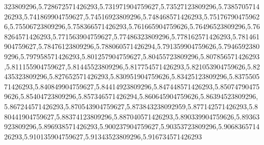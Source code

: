 323809296,5.728672571426293,5.731971904759627,5.73527123809296,5.738570571426293,5.741869904759627,5.74516923809296,5.748468571426293,5.751767904759626,5.75506723809296,5.758366571426293,5.761665904759626,5.76496523809296,5.768264571426293,5.771563904759627,5.77486323809296,5.778162571426293,5.781461904759627,5.78476123809296,5.788060571426294,5.791359904759626,5.79465923809296,5.797958571426293,5.801257904759627,5.80455723809296,5.807856571426293,5.811155904759627,5.81445523809296,5.817754571426293,5.821053904759626,5.82435323809296,5.827652571426293,5.830951904759626,5.83425123809296,5.837550571426293,5.840849904759627,5.84414923809296,5.847448571426293,5.850747904759626,5.85404723809296,5.857346571426294,5.860645904759626,5.86394523809296,5.867244571426293,5.870543904759627,5.873843238092959,5.877142571426293,5.880441904759627,5.88374123809296,5.887040571426293,5.890339904759626,5.89363923809296,5.896938571426293,5.900237904759627,5.90353723809296,5.906836571426293,5.910135904759627,5.91343523809296,5.916734571426293
